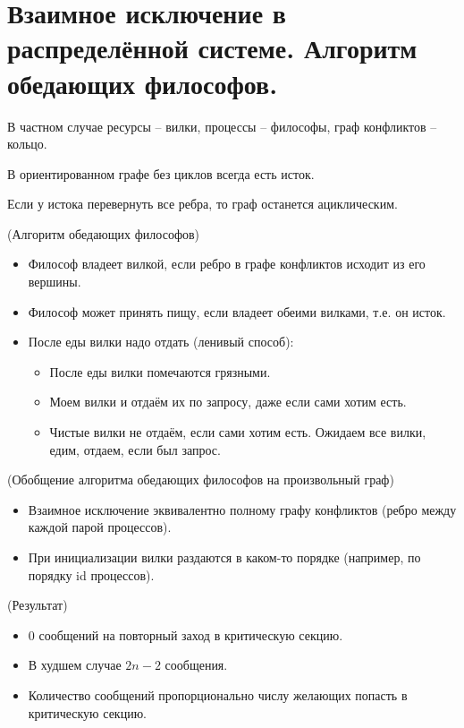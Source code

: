 \section{Взаимное исключение в распределённой системе. Алгоритм обедающих философов.}

\begin{definition}
    В частном случае ресурсы -- вилки, процессы -- философы, граф конфликтов -- кольцо.
\end{definition}

\begin{theorem}
    В ориентированном графе без циклов всегда есть исток.
\end{theorem}

\begin{theorem}
    Если у истока перевернуть все ребра, то граф останется ациклическим.
\end{theorem}

\begin{algorithm}(Алгоритм обедающих философов)
\begin{itemize}
    \item Философ владеет вилкой, если ребро в графе конфликтов исходит из его вершины.
    \item Философ может принять пищу, если владеет обеими вилками, т.е. он исток.
    \item После еды вилки надо отдать (ленивый способ):
        \begin{itemize}
            \item После еды вилки помечаются грязными.
            \item Моем вилки и отдаём их по запросу, даже если сами хотим есть.
            \item Чистые вилки не отдаём, если сами хотим есть. Ожидаем все вилки, 
                едим, отдаем, если был запрос.
        \end{itemize}
\end{itemize}
\end{algorithm}

\begin{algorithm}(Обобщение алгоритма обедающих философов на произвольный граф)
\begin{itemize}
    \item Взаимное исключение эквивалентно полному графу конфликтов (ребро
        между каждой парой процессов).
    \item При инициализации вилки раздаются в каком-то порядке (например,
        по порядку id процессов).
\end{itemize}
\end{algorithm}

\begin{remark} (Результат)
    \begin{itemize}
        \item 0 сообщений на повторный заход в критическую секцию.
        \item В худшем случае $2n-2$ сообщения.
        \item Количество сообщений пропорционально числу желающих попасть в 
            критическую секцию.
    \end{itemize}
\end{remark}

